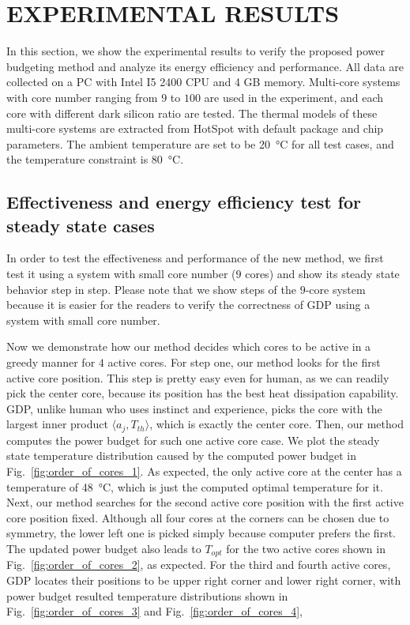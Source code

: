 \section{EXPERIMENTAL RESULTS}
In this section, we show the experimental results to verify the proposed power budgeting method and analyze its energy efficiency and performance. All data are collected on a PC with Intel I5 2400 CPU and 4 GB memory. Multi-core systems with core number ranging from $9$ to $100$ are used in the experiment, and each core with different dark silicon ratio are tested. The thermal models of these multi-core systems are extracted from HotSpot with default package and chip parameters. The ambient temperature are set to be \SI{20}{\degreeCelsius} for all test cases, and the temperature constraint is \SI{80}{\degreeCelsius}.

\subsection{Effectiveness and energy efficiency test for steady state cases}
In order to test the effectiveness and performance of the new method, we first test it
using a system with small core number ($9$ cores) and show its steady state
behavior step in step. Please note that we show steps of the $9$-core system
because it is easier for the readers to verify the correctness of GDP using
a system with small core number.

Now we demonstrate how our method decides which cores to be active in a
greedy manner for $4$ active cores. For step one, our method looks for the first
active core position. This step is pretty easy even for human, as we
can readily pick the center core, because its position has the best
heat dissipation capability. GDP, unlike human who uses instinct and
experience, picks the core with the largest inner product $\langle
a_j, T_{th}\rangle$, which is exactly the center core. 
Then, our method computes the power
budget for such one active core case. We plot the steady state temperature
distribution caused by the computed power budget in
Fig.~\ref{fig:order_of_cores_1}. As expected, the only active core at
the center has a temperature of \SI{48}{\degreeCelsius}, which is just
the computed optimal temperature for it. Next, our method searches for the
second active core position with the first active core position
fixed. Although all four cores at the corners can be chosen due to
symmetry, the lower left one is picked simply because computer prefers
the first. The updated power budget also leads to
$T_{opt}$ for the two active cores shown in Fig.~\ref{fig:order_of_cores_2}, as expected. For the
third and fourth active cores, GDP locates their positions to be 
upper right corner and lower right corner, with power budget
resulted temperature distributions shown in
Fig.~\ref{fig:order_of_cores_3} and Fig.~\ref{fig:order_of_cores_4},


